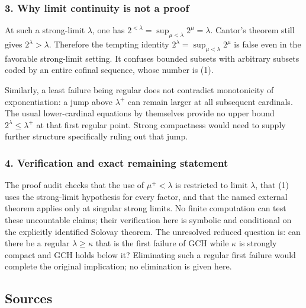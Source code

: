 \documentclass[11pt,a4paper]{article}
\begin{document}
\subsubsection{3. Why limit continuity is not a proof}
At such a strong-limit $\lambda$, one has $2^{<\lambda}=\sup_{\mu<\lambda}2^\mu=\lambda$. Cantor's theorem still gives $2^\lambda>\lambda$. Therefore the tempting identity $2^\lambda=\sup_{\mu<\lambda}2^\mu$ is false even in the favorable strong-limit setting. It confuses bounded subsets with arbitrary subsets coded by an entire cofinal sequence, whose number is (1).

Similarly, a least failure being regular does not contradict monotonicity of exponentiation: a jump above $\lambda^+$ can remain larger at all subsequent cardinals. The usual lower-cardinal equations by themselves provide no upper bound $2^\lambda\leq\lambda^+$ at that first regular point. Strong compactness would need to supply further structure specifically ruling out that jump.

\subsubsection{4. Verification and exact remaining statement}
The proof audit checks that the use of $\mu^+<\lambda$ is restricted to limit $\lambda$, that (1) uses the strong-limit hypothesis for every factor, and that the named external theorem applies only at singular strong limits. No finite computation can test these uncountable claims; their verification here is symbolic and conditional on the explicitly identified Solovay theorem. The unresolved reduced question is: can there be a regular $\lambda\geq\kappa$ that is the first failure of GCH while $\kappa$ is strongly compact and GCH holds below it? Eliminating such a regular first failure would complete the original implication; no elimination is given here.

\subsection{Sources}
\end{document}
